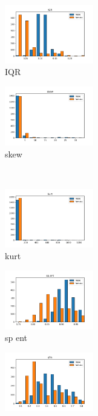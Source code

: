 \documentclass[a4paper]{article}    %
\begin{document}
\begin{figure}[H]
\begin{subfigure}{0.32\textwidth}
        \centering
        \includegraphics[width=3.85cm]{sbs_4_IQR}
        \caption{IQR}
        \label{fig:sub_sbs_5}
    \end{subfigure}\hfill
    \begin{subfigure}{0.32\textwidth}
        \centering
        \includegraphics[width=3.85cm]{sbs_5_skew}
        \caption{skew}
        \label{fig:sub_sbs_6}
    \end{subfigure}
    \\
    \begin{subfigure}{0.32\textwidth}
        \centering
        \includegraphics[width=3.85cm]{sbs_6_kurt}
        \caption{kurt}
        \label{fig:sub_sbs_7}
    \end{subfigure}\hfill
    \begin{subfigure}{0.32\textwidth}
        \centering
        \includegraphics[width=3.85cm]{sbs_7_sp_ent}
        \caption{sp ent}
        \label{fig:sub_sbs_8}
    \end{subfigure}\hfill
    \begin{subfigure}{0.32\textwidth}
        \centering
        \includegraphics[width=3.85cm]{sbs_8_sfm}

\end{subfigure}
\end{figure}
\end{document}
